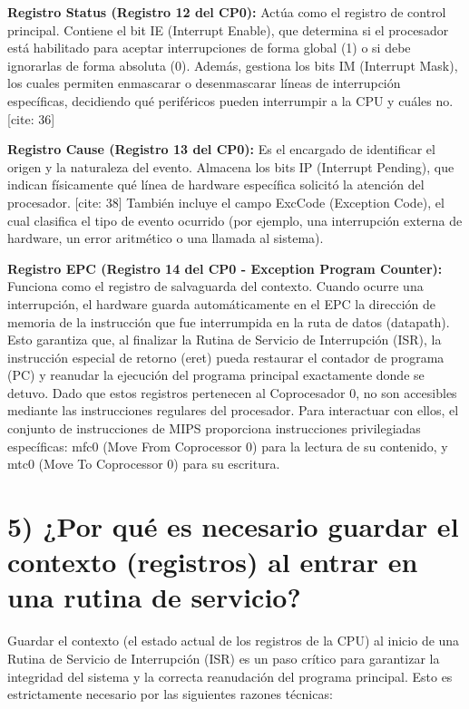 \documentclass[12pt]{article}
\begin{document}
\textbf{Registro Status (Registro 12 del CP0):} Actúa como el registro de control principal.  Contiene el bit IE (Interrupt Enable), que determina si el procesador está habilitado para aceptar interrupciones de forma global (1) o si debe ignorarlas de forma absoluta (0).  Además, gestiona los bits IM (Interrupt Mask), los cuales permiten enmascarar o desenmascarar líneas de interrupción específicas, decidiendo qué periféricos pueden interrumpir a la CPU y cuáles no. [cite: 36]

\textbf{Registro Cause (Registro 13 del CP0):} Es el encargado de identificar el origen y la naturaleza del evento. Almacena los bits IP (Interrupt Pending), que indican físicamente qué línea de hardware específica solicitó la atención del procesador. [cite: 38] También incluye el campo ExcCode (Exception Code), el cual clasifica el tipo de evento ocurrido (por ejemplo, una interrupción externa de hardware, un error aritmético o una llamada al sistema). 

\textbf{Registro EPC (Registro 14 del CP0 - Exception Program Counter):} Funciona como el registro de salvaguarda del contexto. Cuando ocurre una interrupción, el hardware guarda automáticamente en el EPC la dirección de memoria de la instrucción que fue interrumpida en la ruta de datos (datapath).  Esto garantiza que, al finalizar la Rutina de Servicio de Interrupción (ISR), la instrucción especial de retorno (eret) pueda restaurar el contador de programa (PC) y reanudar la ejecución del programa principal exactamente donde se detuvo. 
Dado que estos registros pertenecen al Coprocesador 0, no son accesibles mediante las instrucciones regulares del procesador. Para interactuar con ellos, el conjunto de instrucciones de MIPS proporciona instrucciones privilegiadas específicas: mfc0 (Move From Coprocessor 0) para la lectura de su contenido, y mtc0 (Move To Coprocessor 0) para su escritura. 
\vspace{1cm}

\section*{5) ¿Por qué es necesario guardar el contexto (registros) al entrar en una rutina de servicio?} 

Guardar el contexto (el estado actual de los registros de la CPU) al inicio de una Rutina de Servicio de Interrupción (ISR) es un paso crítico para garantizar la integridad del sistema y la correcta reanudación del programa principal. Esto es estrictamente necesario por las siguientes razones técnicas:
\end{document}
